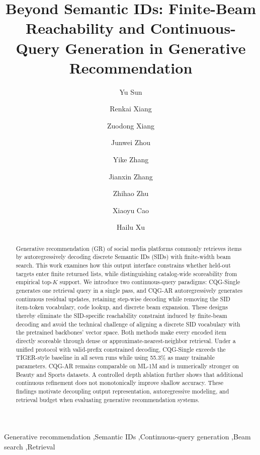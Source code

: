 \documentclass[preprint,12pt]{elsarticle}
\begin{document}
\begin{frontmatter}
\title{Beyond Semantic IDs: Finite-Beam Reachability and Continuous-Query Generation in Generative Recommendation}
\author{Yu Sun}
\author{Renkai Xiang}
\author{Zuodong Xiang}
\author{Junwei Zhou}
\author{Yike Zhang}
\author{Jianxin Zhang}
\author{Zhihao Zhu}
\author{Xiaoyu Cao}
\author{Hailu Xu}
\begin{abstract}
Generative recommendation (GR) of social media platforms commonly retrieves items by autoregressively decoding discrete Semantic IDs (SIDs) with finite-width
beam search. This work examines how this output interface constrains whether held-out targets
enter finite returned lists, while distinguishing catalog-wide
scoreability from empirical top-$K$ support. We introduce two
continuous-query paradigms: 
CQG-Single generates one retrieval query in a single pass, and CQG-AR autoregressively
generates continuous residual updates, retaining step-wise
decoding while removing the SID item-token vocabulary, code lookup, and
discrete beam expansion. These designs thereby eliminate the SID-specific reachability constraint induced by finite-beam decoding and avoid the technical challenge of aligning a discrete SID vocabulary with the pretrained backbones' vector space. Both methods make every encoded item directly scoreable
through dense or approximate-nearest-neighbor retrieval. Under a unified
protocol with valid-prefix constrained decoding, 
CQG-Single exceeds the TIGER-style
baseline in all seven runs 
while using 55.3\% as many trainable
parameters. CQG-AR remains comparable on ML-1M and is numerically stronger
on Beauty and Sports datasets. A controlled depth ablation further shows that
additional continuous refinement does not monotonically improve shallow
accuracy. These findings motivate decoupling output representation,
autoregressive modeling, and retrieval budget when evaluating generative
recommendation systems.
\end{abstract}
\begin{keyword}
Generative recommendation \sep Semantic IDs \sep Continuous-query generation \sep Beam search \sep Retrieval
\end{keyword}
\end{frontmatter}
\end{document}
